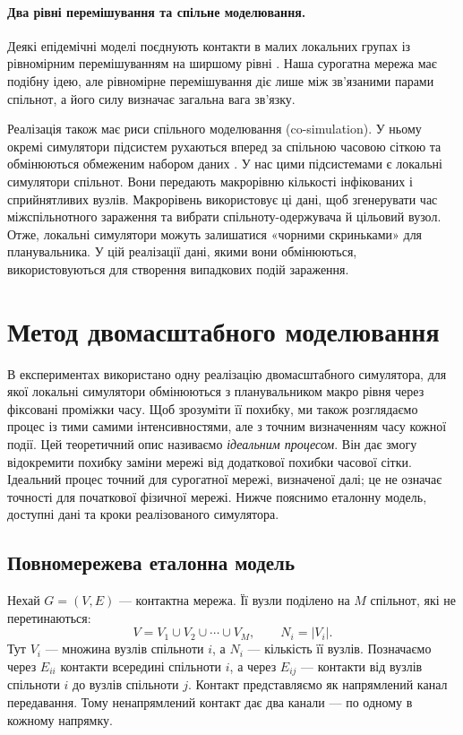 \documentclass[a4paper,fleqn]{cas-sc}
\begin{document}
\paragraph{Два рівні перемішування та спільне моделювання.}
Деякі епідемічні моделі поєднують контакти в малих локальних групах із рівномірним перемішуванням на ширшому рівні \citep{ball1997}. Наша сурогатна мережа має подібну ідею, але рівномірне перемішування діє лише між зв'язаними парами спільнот, а його силу визначає загальна вага зв'язку.

Реалізація також має риси спільного моделювання (co-simulation). У ньому окремі симулятори підсистем рухаються вперед за спільною часовою сіткою та обмінюються обмеженим набором даних \citep{gomes2018cosim}. У нас цими підсистемами є локальні симулятори спільнот. Вони передають макрорівню кількості інфікованих і сприйнятливих вузлів. Макрорівень використовує ці дані, щоб згенерувати час міжспільнотного зараження та вибрати спільноту-одержувача й цільовий вузол. Отже, локальні симулятори можуть залишатися «чорними скриньками» для планувальника. У цій реалізації дані, якими вони обмінюються, використовуються для створення випадкових подій зараження.

\section{Метод двомасштабного моделювання}
\label{sec:method}

В експериментах використано одну реалізацію двомасштабного симулятора, для якої локальні симулятори обмінюються з планувальником макро рівня через фіксовані проміжки часу. Щоб зрозуміти її похибку, ми також розглядаємо процес із тими самими інтенсивностями, але з точним визначенням часу кожної події. Цей теоретичний опис називаємо \emph{ідеальним процесом}. Він дає змогу відокремити похибку заміни мережі від додаткової похибки часової сітки. Ідеальний процес точний для сурогатної мережі, визначеної далі; це не означає точності для початкової фізичної мережі. Нижче пояснимо еталонну модель, доступні дані та кроки реалізованого симулятора.

\subsection{Повномережева еталонна модель}
\label{sec:reference}

Нехай $G=(V,E)$ --- контактна мережа. Її вузли поділено на $M$ спільнот, які не перетинаються:
\begin{equation}
\label{eq:partition}
V=V_1\cup V_2\cup\cdots\cup V_M,
\qquad N_i=|V_i|.
\end{equation}
Тут $V_i$ --- множина вузлів спільноти $i$, а $N_i$ --- кількість її вузлів. Позначаємо через $E_{ii}$ контакти всередині спільноти $i$, а через $E_{ij}$ --- контакти від вузлів спільноти $i$ до вузлів спільноти $j$. Контакт представляємо як напрямлений канал передавання. Тому ненапрямлений контакт дає два канали --- по одному в кожному напрямку.
\end{document}

